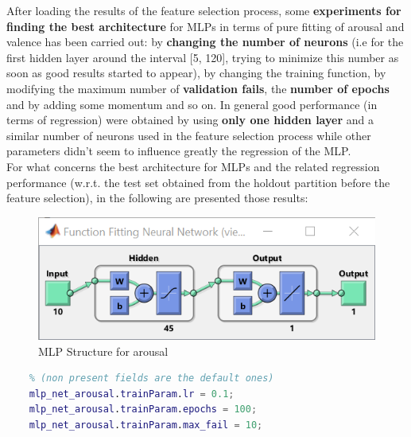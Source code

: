 After loading the results of the feature selection process, some \textbf{experiments for finding the best architecture} for MLPs in terms of pure fitting of arousal and valence has been carried out:
by \textbf{changing the number of neurons} (i.e for the first hidden layer around the interval [5, 120], trying to minimize this number as soon as good results started to appear), by changing the training function, by modifying the maximum number of \textbf{validation fails}, the \textbf{number of epochs} and by adding some momentum and so on.
In general good performance (in terms of regression) were obtained by using \textbf{only one hidden layer} and a similar number of neurons used in the feature selection process while other parameters didn't seem to influence greatly the regression of the MLP. \\
For what concerns the best architecture for MLPs and the related regression performance (w.r.t. the test set obtained from the holdout partition before the feature selection), in the following are presented those results:
\begin{figure}[H]
	\centering
	\includegraphics{img/arousal_mlp_45.png} 
	\caption{MLP Structure for arousal}
\end{figure}
\begin{lstlisting}[language=Matlab]
	% Configuration for training of the MLP for arousal 
	% (non present fields are the default ones)
	mlp_net_arousal.trainParam.lr = 0.1; 
	mlp_net_arousal.trainParam.epochs = 100;
	mlp_net_arousal.trainParam.max_fail = 10;
\end{lstlisting}

